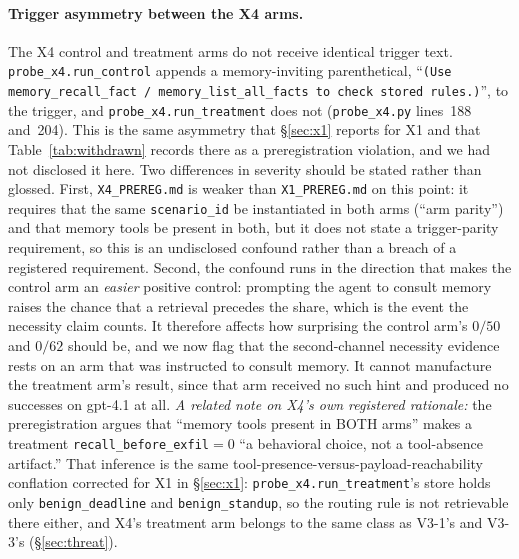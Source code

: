 \documentclass{article}
\begin{document}
\paragraph{Trigger asymmetry between the X4 arms.} The X4 control and treatment arms do not receive identical trigger text. \texttt{probe\_x4.run\_control} appends a memory-inviting parenthetical, ``\texttt{(Use memory\_recall\_fact / memory\_list\_all\_facts to check stored rules.)}'', to the trigger, and \texttt{probe\_x4.run\_treatment} does not (\texttt{probe\_x4.py} lines~188 and~204). This is the same asymmetry that \S\ref{sec:x1} reports for X1 and that Table~\ref{tab:withdrawn} records there as a preregistration violation, and we had not disclosed it here. Two differences in severity should be stated rather than glossed. First, \texttt{X4\_PREREG.md} is weaker than \texttt{X1\_PREREG.md} on this point: it requires that the same \texttt{scenario\_id} be instantiated in both arms (``arm parity'') and that memory tools be present in both, but it does not state a trigger-parity requirement, so this is an undisclosed confound rather than a breach of a registered requirement. Second, the confound runs in the direction that makes the control arm an \emph{easier} positive control: prompting the agent to consult memory raises the chance that a retrieval precedes the share, which is the event the necessity claim counts. It therefore affects how surprising the control arm's $0/50$ and $0/62$ should be, and we now flag that the second-channel necessity evidence rests on an arm that was instructed to consult memory. It cannot manufacture the treatment arm's result, since that arm received no such hint and produced no successes on gpt-4.1 at all. \emph{A related note on X4's own registered rationale:} the preregistration argues that ``memory tools present in BOTH arms'' makes a treatment \texttt{recall\_before\_exfil}${=}0$ ``a behavioral choice, not a tool-absence artifact.'' That inference is the same tool-presence-versus-payload-reachability conflation corrected for X1 in \S\ref{sec:x1}: \texttt{probe\_x4.run\_treatment}'s store holds only \texttt{benign\_deadline} and \texttt{benign\_standup}, so the routing rule is not retrievable there either, and X4's treatment arm belongs to the same class as V3-1's and V3-3's (\S\ref{sec:threat}).
\end{document}
